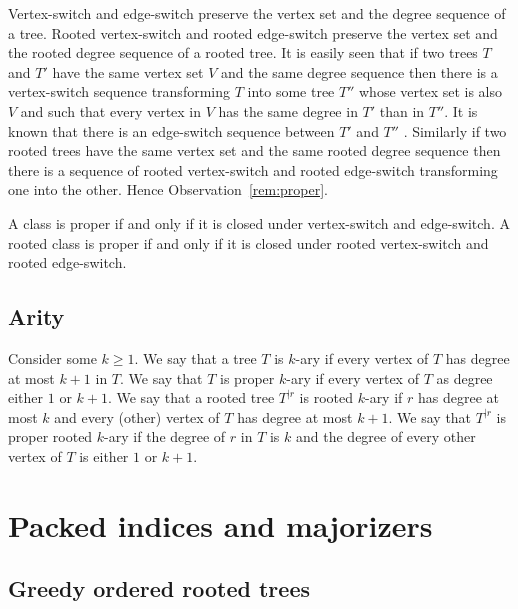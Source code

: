 \documentclass[11 pt]{modarticle}
\newcommand{\rtree}[2]{{#1}^{\lvert #2}}
\newcommand{\tclass}{\mathcal{C}}
\newcommand{\rtclass}{\mathcal{R}}
\begin{document}
Vertex-switch and edge-switch preserve the vertex set and the degree sequence of a tree. Rooted vertex-switch and rooted edge-switch preserve the vertex set and the rooted degree sequence of a rooted tree. It is easily seen that if two trees $T$ and $T'$ have the same vertex set $V$ and the same degree sequence then there is a vertex-switch sequence transforming $T$ into some tree $T''$ whose vertex set is also $V$ and such that every vertex in $V$ has the same degree in $T'$ than in $T''$. It is known that there is an edge-switch sequence between $T'$ and $T''$ \cite[Theorem~4.3]{switch}. Similarly if two rooted trees have the same vertex set and the same rooted degree sequence then there is a sequence of rooted vertex-switch and rooted edge-switch transforming one into the other. Hence Observation~\ref{rem:proper}.

\begin{rem}\label{rem:proper}
A class is proper if and only if it is closed under vertex-switch and edge-switch. A rooted class is proper if and only if it is closed under rooted vertex-switch and rooted edge-switch.
\end{rem}

\subsection{Arity}

Consider some $k \geq 1$. We say that a tree $T$ is $k$-ary if every vertex of $T$ has degree at most $k+1$ in $T$. We say that $T$ is proper $k$-ary if every vertex of $T$ as degree either $1$ or $k+1$. We say that a rooted tree $\rtree{T}{r}$ is rooted $k$-ary if $r$ has degree at most $k$ and every (other) vertex of $T$ has degree at most $k+1$. We say that $\rtree{T}{r}$ is proper rooted $k$-ary if the degree of $r$ in $T$ is $k$ and the degree of every other vertex of $T$ is either $1$ or $k+1$. 


\section{Packed indices and majorizers}

\subsection{Greedy ordered rooted trees}
\end{document}
